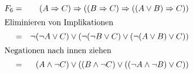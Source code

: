\documentclass[10pt,a4paper,oneside,ngerman,numbers=noenddot]{scrartcl}
\begin{document}
\subsection{} %
\begin{alignat*}{2}
F_{6} &=& (A \Rightarrow C) \Rightarrow ((B \Rightarrow C) \Rightarrow ((A \vee B) \Rightarrow C)) \\
\intertext{Eliminieren von Implikationen}
&=& \neg(\neg A \vee C) \vee (\neg(\neg B \vee C) \vee (\neg(A \vee B) \vee C)) \\
\intertext{Negationen nach innen ziehen}
&=& (A \wedge \neg C) \vee ((B \wedge \neg C) \vee ((\neg A \wedge \neg B) \vee C))
\end{alignat*}\\
\end{document}
